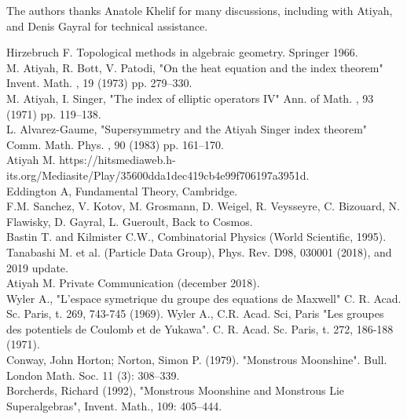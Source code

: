 \documentclass[a4paper,9pt]{article}
\begin{document}
The authors thanks Anatole Khelif for many discussions, including with Atiyah, and Denis Gayral for technical assistance.

  
\begin{thebibliography}{99}
 Hirzebruch F. Topological methods in algebraic geometry. Springer 1966.\\
 M. Atiyah, R. Bott, V. Patodi, "On the heat equation and the index theorem" Invent. Math. , 19 (1973) pp. 279--330.\\
 M. Atiyah, I. Singer, "The index of elliptic operators IV" Ann. of Math. , 93 (1971) pp. 119--138. \\
 L. Alvarez-Gaume, "Supersymmetry and the Atiyah Singer index theorem" Comm. Math. Phys. , 90 (1983) pp. 161--170.\\
 Atiyah M. https://hitsmediaweb.h-its.org/Mediasite/Play/35600dda1dec419cb4e99f706197a3951d. \\ 
 Eddington A, Fundamental Theory, Cambridge.\\
 F.M. Sanchez, V. Kotov, M. Grosmann, D. Weigel, R. Veysseyre, C. Bizouard, N. Flawisky, D. Gayral, L. Gueroult, Back to Cosmos.\\
 Bastin T. and Kilmister C.W., Combinatorial Physics (World Scientific, 1995).\\
 Tanabashi M. et al. (Particle Data Group), Phys. Rev. D98, 030001 (2018), and 2019 update.\\
 Atiyah M. Private Communication (december 2018).\\
 Wyler A., "L'espace symetrique du groupe des equations de Maxwell" C. R. Acad. Sc. Paris, t. 269, 743-745 (1969). Wyler A., C.R. Acad. Sci, Paris "Les groupes des potentiels de Coulomb et de Yukawa". C. R. Acad. Sc. Paris, t. 272, 186-188 (1971).\\
 Conway, John Horton; Norton, Simon P. (1979). "Monstrous Moonshine". Bull. London Math. Soc. 11 (3): 308--339.\\
 Borcherds, Richard (1992), "Monstrous Moonshine and Monstrous Lie Superalgebras", Invent. Math., 109: 405--444.\\

\end{thebibliography}
\end{document}
